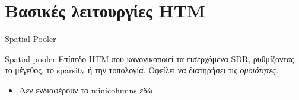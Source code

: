 \documentclass[11pt,center]{beamer}
\begin{document}
\section{Βασικές λειτουργίες HTM}
\begin{frame}{Spatial Pooler}
  \begin{block}{Spatial pooler}
	Επίπεδο HTM που κανονικοποιεί τα εισερχόμενα SDR, ρυθμίζοντας το μέγεθος, το sparsity ή την τοπολογία.
	Οφείλει να διατηρήσει τις \em{ομοιότητες}.
	\begin{itemize}
	  \item Δεν ενδιαφέρουν τα minicolumns εδώ
	\end{itemize}
  \end{block}

\end{frame}
\end{document}
